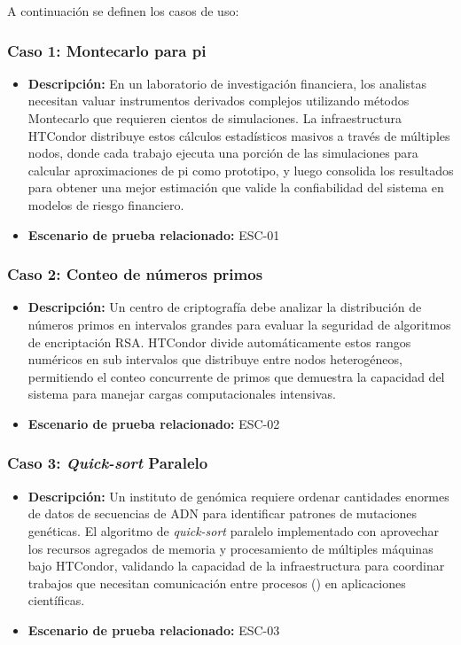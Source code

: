 A continuación se definen los casos de uso:

\subsubsection{Caso 1: Montecarlo para pi}
\noindent
\begin{itemize}
    \item \textbf{Descripción:} En un laboratorio de investigación financiera, los analistas necesitan valuar instrumentos derivados complejos utilizando métodos Montecarlo que requieren cientos de simulaciones. La infraestructura HTCondor distribuye estos cálculos estadísticos masivos a través de múltiples nodos, donde cada trabajo ejecuta una porción de las simulaciones para calcular aproximaciones de pi como prototipo, y luego consolida los resultados para obtener una mejor estimación que valide la confiabilidad del sistema en modelos de riesgo financiero.
    \item \textbf{Escenario de prueba relacionado:} ESC-01
\end{itemize}

\subsubsection{Caso 2: Conteo de números primos}
\noindent
\begin{itemize}
    \item \textbf{Descripción:} Un centro de criptografía debe analizar la distribución de números primos en intervalos grandes para evaluar la seguridad de algoritmos de encriptación RSA. HTCondor divide automáticamente estos rangos numéricos en sub intervalos que distribuye entre nodos heterogéneos, permitiendo el conteo concurrente de primos que demuestra la capacidad del sistema para manejar cargas computacionales intensivas.
    \item \textbf{Escenario de prueba relacionado:} ESC-02
\end{itemize}

\subsubsection{Caso 3: \textit{Quick-sort} Paralelo}
\noindent
\begin{itemize}
    \item \textbf{Descripción:} Un instituto de genómica requiere ordenar cantidades enormes de datos de secuencias de ADN para identificar patrones de mutaciones genéticas. El algoritmo de \textit{quick-sort} paralelo implementado con \MPI aprovechar los recursos agregados de memoria y procesamiento de múltiples máquinas bajo HTCondor, validando la capacidad de la infraestructura para coordinar trabajos que necesitan comunicación entre procesos (\IPC) en aplicaciones científicas.
    \item \textbf{Escenario de prueba relacionado:} ESC-03
\end{itemize}

